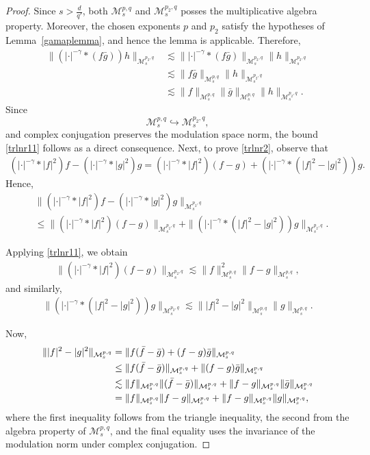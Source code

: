 \documentclass[12pt,reqno,a4paper]{amsart}
\numberwithin{equation}{section}
\theoremstyle{plain}
\theoremstyle{definition}
\theoremstyle{remark}
\def\M{\mathcal{M}}
\def \M{{\mathcal M}}
\begin{document}
\begin{proof}
Since \(s>\frac{d}{q'}\), both \(\M^{p,q}_{s}\) and \(\M^{p_{2},q}_{s}\) posses the multiplicative algebra property. Moreover, the chosen exponents \(p\) and \(p_{2}\) satisfy the hypotheses of Lemma~\ref{gamaplemma}, and hence the lemma is applicable. Therefore,
\begin{align*}
\|(|\cdot|^{-\gamma}*(f\bar{g}))h\|_{\M^{p_{2},q}_{s}}
&\lesssim
\||\cdot|^{-\gamma}*(f\bar{g})\|_{\M^{p_{2},q}_{s}}
\|h\|_{\M^{p_{2},q}_{s}}
\\
&\lesssim
\|f\bar{g}\|_{\M^{p,q}_{s}}
\|h\|_{\M^{p_{2},q}_{s}}
\\
&\lesssim
\|f\|_{\M^{p,q}_{s}}
\|\bar{g}\|_{\M^{p,q}_{s}}
\|h\|_{\M^{p_{2},q}_{s}}.
\end{align*}
Since
\[
\M^{p,q}_{s}\hookrightarrow \M^{p_{2},q}_{s},
\]
and complex conjugation preserves the modulation space norm, the bound \eqref{trlnr11} follows as a direct consequence.
Next, to prove \eqref{trlnr2}, observe that
\begin{align*}
(|\cdot|^{-\gamma}*|f|^{2})f-(|\cdot|^{-\gamma}*|g|^{2})g
=
(|\cdot|^{-\gamma}*|f|^{2})(f-g)
+
(|\cdot|^{-\gamma}*(|f|^{2}-|g|^{2}))g.
\end{align*}
Hence,
\begin{align}
\nonumber
&\|(|\cdot|^{-\gamma}*|f|^{2})f-(|\cdot|^{-\gamma}*|g|^{2})g\|_{\mathcal{M}^{p_{2},q}_{s}} \\
\label{est0}
&\leq
\|(|\cdot|^{-\gamma}*|f|^{2})(f-g)\|_{\mathcal{M}^{p_{2},q}_{s}}
+
\|(|\cdot|^{-\gamma}*(|f|^{2}-|g|^{2}))g\|_{\mathcal{M}^{p_{2},q}_{s}}.
\end{align}

Applying \eqref{trlnr11}, we obtain
\begin{align}
\label{est1}
\|(|\cdot|^{-\gamma}*|f|^{2})(f-g)\|_{\mathcal{M}^{p_{2},q}_{s}}
\lesssim
\|f\|_{\mathcal{M}^{p,q}_{s}}^{2}
\|f-g\|_{\mathcal{M}^{p,q}_{s}},
\end{align}
and similarly,
\begin{align}
\label{est2}
\|(|\cdot|^{-\gamma}*(|f|^{2}-|g|^{2}))g\|_{\mathcal{M}^{p_{2},q}_{s}}
\lesssim
\||f|^{2}-|g|^{2}\|_{\mathcal{M}^{p,q}_{s}}
\|g\|_{\mathcal{M}^{p,q}_{s}}.
\end{align}

Now,
\begin{align}
\nonumber
\||f|^{2}-|g|^{2}\|_{\mathcal{M}^{p,q}_{s}}
&=
\|f(\Bar{f}-\Bar{g})+(f-g)\Bar{g}\|_{\mathcal{M}^{p,q}_{s}} \\
\nonumber
&\leq
\|f(\Bar{f}-\Bar{g})\|_{\mathcal{M}^{p,q}_{s}}
+
\|(f-g)\Bar{g}\|_{\mathcal{M}^{p,q}_{s}} \\
\nonumber
&\lesssim
\|f\|_{\mathcal{M}^{p,q}_{s}}
\|(\Bar{f}-\Bar{g})\|_{\mathcal{M}^{p,q}_{s}}
+
\|f-g\|_{\mathcal{M}^{p,q}_{s}}
\|\Bar{g}\|_{\mathcal{M}^{p,q}_{s}} \\
\label{est3}
&=
\|f\|_{\mathcal{M}^{p,q}_{s}}
\|f-g\|_{\mathcal{M}^{p,q}_{s}}
+
\|f-g\|_{\mathcal{M}^{p,q}_{s}}
\|g\|_{\mathcal{M}^{p,q}_{s}},
\end{align}
where the first inequality follows from the triangle inequality, the second from the algebra property of $\mathcal{M}^{p,q}_{s}$, and the final equality uses the invariance of the modulation norm under complex conjugation.


\end{proof}
\end{document}
